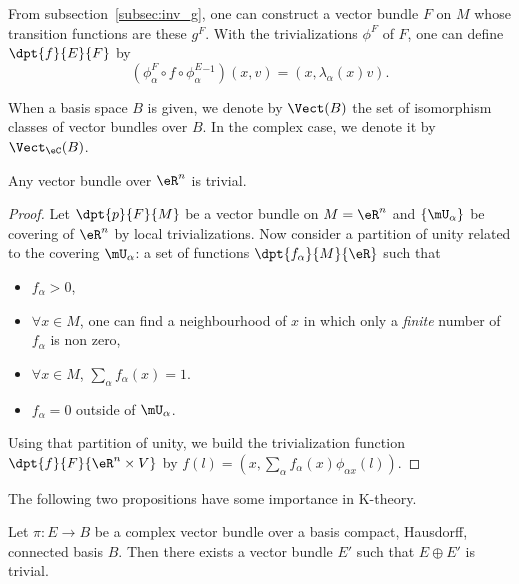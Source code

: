 From subsection~\ref{subsec:inv_g}, one can construct a vector bundle $F$ on $M$ whose transition functions are these $g^F$. With the trivializations $\phi^F$ of $F$, one can define $\dpt{f}{E}{F}$ by
\[
	(\phi^F_{\alpha}\circ f\circ\phi^E_{\alpha}{}^{-1})(x,v)=(x,\lambda_{\alpha}(x)v).
\]

When a basis space $B$ is given, we denote by $\Vect(B)$ the set of isomorphism classes of vector bundles over $B$. In the complex case, we denote it by $\Vect_{\eC}(B)$.

\begin{proposition}
	Any vector bundle over $\eR^n$ is trivial.
\end{proposition}

\begin{proof}
	Let $\dpt{p}{F}{M}$ be a vector bundle on $M=\eR^n$ and $\{\mU_{\alpha}\}$ be covering of $\eR^n$ by local trivializations. Now consider a partition of unity related to the covering $\mU_{\alpha}$: a set of functions $\dpt{f_{\alpha}}{M}{\eR}$ such that
	\begin{itemize}
		\item $f_{\alpha}>0$,
		\item $\forall x\in M$, one can find a neighbourhood of $x$ in which only a \emph{finite} number of $f_{\alpha}$ is non zero,
		\item $\forall x\in M$, $\sum_{\alpha} f_{\alpha}(x)=1$.
		\item $f_{\alpha}=0$ outside of $\mU_{\alpha}$.
	\end{itemize}
	Using that partition of unity, we build the trivialization function $\dpt{f}{F}{\eR^n\times V}$ by $f(l)=(x,\sum_{\alpha} f_{\alpha}(x)\phi_{\alpha x}(l))$.
\end{proof}

The following two propositions have some importance in K-theory.
\begin{proposition}		\label{PropEoplusEprimetriv}
	Let $\pi\colon E\to B$ be a complex vector bundle over a basis compact, Hausdorff, connected basis $B$. Then there exists a vector bundle $E'$ such that $E\oplus E'$ is trivial.
\end{proposition}

